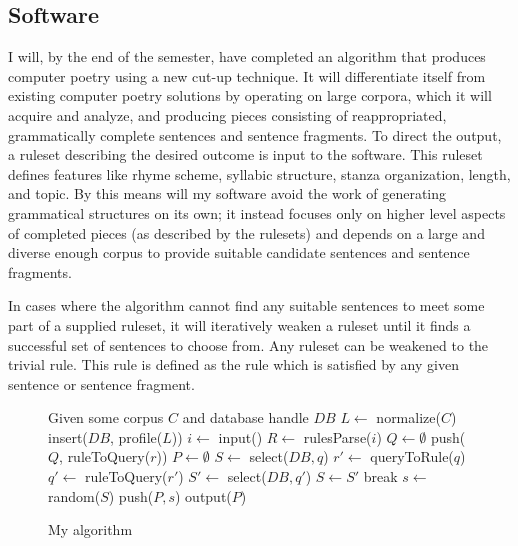 \documentclass[10pt]{article}
\begin{document}
\subsection{Software}
I will, by the end of the semester, have completed an algorithm that
produces computer poetry using a new cut-up technique. It will
differentiate itself from existing computer poetry solutions by operating
on large corpora, which it will acquire and analyze, and producing pieces
consisting of reappropriated, grammatically complete sentences and sentence
fragments. To direct the output, a ruleset describing the desired outcome is
input to the software. This ruleset defines features like rhyme scheme,
syllabic structure, stanza organization, length, and topic. By this means will
my software avoid the work of generating grammatical structures on its own; it
instead focuses only on higher level aspects of completed pieces (as described
by the rulesets) and depends on a large and diverse enough corpus to provide
suitable candidate sentences and sentence fragments.

In cases where the algorithm cannot find any suitable sentences to meet some part
of a supplied ruleset, it will iteratively weaken a ruleset until it finds a
successful set of sentences to choose from. Any ruleset can be weakened to the
trivial rule. This rule is defined as the rule which is satisfied by any given
sentence or sentence fragment.

\pagebreak
\onehalfspacing
\begin{figure}[here]
\begin{algorithmic}
\STATE Given some corpus $C$ and database handle $DB$
\STATE $L\gets$ normalize($C$)
\STATE insert($DB$, profile($L$))
\STATE $i \gets$ input()
\STATE $R \gets$ rulesParse($i$)
\STATE $Q \gets \emptyset$
    \STATE push($Q$, ruleToQuery($r$))
\ENDFOR
\STATE $P \gets \emptyset$
    \STATE $S \gets$ select($DB, q$)
        \STATE $r\prime \gets$ queryToRule($q$)
            \STATE $q\prime \gets$ ruleToQuery($r\prime$)
            \STATE $S\prime \gets$ select($DB, q\prime$)
                \STATE $S \gets S\prime$
                \STATE break
            \ENDIF
        \ENDWHILE
    \ENDIF
    \STATE $s \gets$ random($S$)
    \STATE push($P, s$)
\ENDFOR
\STATE output($P$)
\end{algorithmic}
\caption{My algorithm}
\label{fig:algorithm}
\end{figure}
\doublespacing
\end{document}
